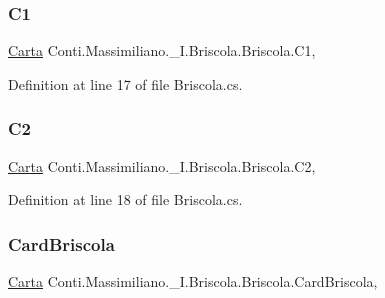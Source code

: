 \subsubsection{\texorpdfstring{C1}{C1}}
{\footnotesize\ttfamily \hyperlink{class_conti_1_1_massimiliano_1_1__5_i_1_1_briscola_1_1_carta}{Carta} Conti.\+Massimiliano.\+\_\+I.\+Briscola.\+Briscola.\+C1\hspace{0.3cm}{\ttfamily [get]}, {\ttfamily [set]}}



Definition at line 17 of file Briscola.\+cs.

\hypertarget{class_conti_1_1_massimiliano_1_1__5_i_1_1_briscola_1_1_briscola_a028cf522d536002979f0aa9a89994e3b}{}\label{class_conti_1_1_massimiliano_1_1__5_i_1_1_briscola_1_1_briscola_a028cf522d536002979f0aa9a89994e3b} 
\subsubsection{\texorpdfstring{C2}{C2}}
{\footnotesize\ttfamily \hyperlink{class_conti_1_1_massimiliano_1_1__5_i_1_1_briscola_1_1_carta}{Carta} Conti.\+Massimiliano.\+\_\+I.\+Briscola.\+Briscola.\+C2\hspace{0.3cm}{\ttfamily [get]}, {\ttfamily [set]}}



Definition at line 18 of file Briscola.\+cs.

\hypertarget{class_conti_1_1_massimiliano_1_1__5_i_1_1_briscola_1_1_briscola_acc665c102dd48b4b45662bad2cd57015}{}\label{class_conti_1_1_massimiliano_1_1__5_i_1_1_briscola_1_1_briscola_acc665c102dd48b4b45662bad2cd57015} 
\subsubsection{\texorpdfstring{Card\+Briscola}{CardBriscola}}
{\footnotesize\ttfamily \hyperlink{class_conti_1_1_massimiliano_1_1__5_i_1_1_briscola_1_1_carta}{Carta} Conti.\+Massimiliano.\+\_\+I.\+Briscola.\+Briscola.\+Card\+Briscola\hspace{0.3cm}{\ttfamily [get]}, {\ttfamily [set]}}



